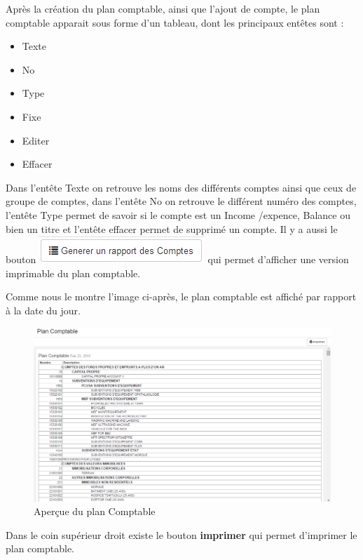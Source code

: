 \documentclass[12pt,a4paper]{report}
\begin{document}
Après la création du plan comptable, ainsi que l'ajout de compte, le plan comptable apparait sous forme d'un tableau, dont les principaux entêtes sont :
\begin{itemize}
\item Texte
\item No
\item Type
\item Fixe
\item Editer
\item Effacer
\end{itemize}

Dans l'entête Texte on retrouve les noms des différents comptes ainsi que ceux de groupe de comptes, dans l'entête No on retrouve le différent numéro des comptes, l'entête Type permet de savoir si le compte est un Income /expence, Balance ou bien un titre et l'entête effacer permet de supprimé un compte.  Il y a aussi le bouton \includegraphics[scale=0.7]{pic/GenereRapportCompt.png} qui permet d'afficher une version imprimable du plan comptable.

Comme nous le montre l'image ci-après, le plan comptable est affiché par rapport à la date du jour.\\

\begin{figure}[h]
\begin{center}
\includegraphics[width=14cm]{pic/PlanComptable.png}
\end{center}
\caption{Aperçue du plan Comptable}
\label{Aperçue du plan Comptable}
\end{figure}

Dans le coin supérieur droit existe le bouton \textbf{imprimer} qui permet d'imprimer le plan comptable.
\end{document}
